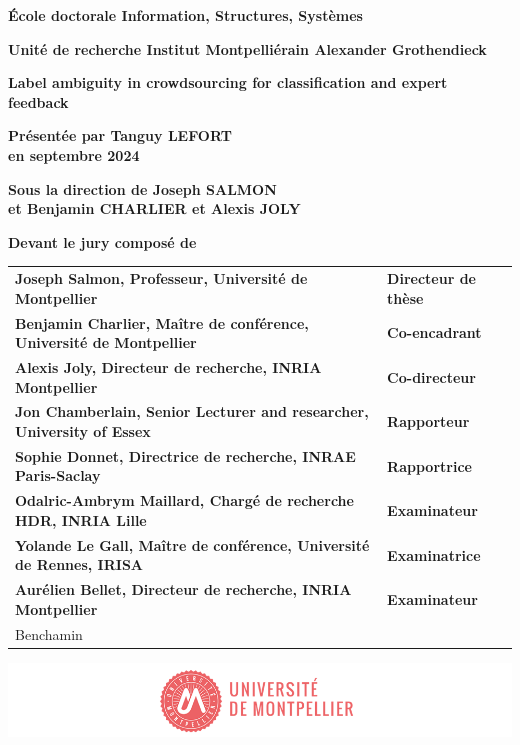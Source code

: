 \documentclass[
a4paper, %
12pt]{book}
\begin{document}
\begin{titlepage}
{\bigskip
\textbf{École doctorale Information, Structures, Systèmes}

\bigskip
\textbf{Unité de recherche Institut Montpelliérain Alexander Grothendieck}


\color{Titleblue}
\fontsize{17}{20.4}\selectfont
\vspace{2cm}
\textbf{Label ambiguity in crowdsourcing for classification and
expert feedback}


\vspace{4cm}
\fontsize{15}{18}\selectfont
\color{black}
\textbf{Présentée par Tanguy LEFORT\\
en septembre 2024}

\bigskip
\fontsize{13}{15.6}\selectfont
\textbf{Sous la direction de Joseph SALMON\\
et Benjamin CHARLIER et Alexis JOLY}

\vspace{1.5cm}
\normalsize
\textbf{Devant le jury composé de}\\
\bigskip
\fontsize{10}{12}\selectfont
\vspace{1.5mm}
\begin{tabular}{p{14cm}l}
\textbf{Joseph Salmon, Professeur, Université de Montpellier} & \textbf{Directeur de thèse} \\
\textbf{Benjamin Charlier, Maître de conférence, Université de Montpellier} & \textbf{Co-encadrant} \\
\textbf{Alexis Joly, Directeur de recherche, INRIA Montpellier} & \textbf{Co-directeur} \\
\textbf{Jon Chamberlain, Senior Lecturer and researcher, University of Essex} & \textbf{Rapporteur} \\
\textbf{Sophie Donnet, Directrice de recherche, INRAE Paris-Saclay} & \textbf{Rapportrice} \\
\textbf{Odalric-Ambrym Maillard, Chargé de recherche HDR, INRIA Lille} & \textbf{Examinateur} \\
\textbf{Yolande Le Gall, Maître de conférence, Université de Rennes, IRISA} & \textbf{Examinatrice} \\
\textbf{Aurélien Bellet, Directeur de recherche, INRIA Montpellier} & \textbf{Examinateur} \\Benchamin

\end{tabular}

\vspace{\fill}
\includegraphics[scale=1]{images/PhD_Couverture_LogoUM.png}
\vspace{-15mm}}
\end{titlepage}


% 
\end{document}
